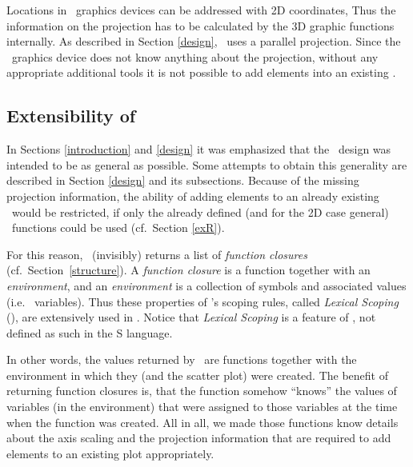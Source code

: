 Locations in \RR\ graphics devices can be addressed with 2D coordinates,
Thus the information on the projection has to be calculated by the 3D graphic functions internally.
As described in Section \ref{design}, \sdd\ uses a parallel projection.
Since the \RR\ graphics device does not know anything about the projection,
without any appropriate additional tools it is not possible to add elements into an existing \sdd .


\subsection{Extensibility of \sdd\label{exsdd}}
In Sections \ref{introduction} and \ref{design} it was emphasized
that the \sdd\ design was intended to be as general as possible.
Some attempts to obtain this generality are described in Section \ref{design} and its subsections.
Because of the missing projection information, the ability of adding
elements to an already existing \sdd\ would be restricted, if only the
already defined (and for the 2D case general) \RR\ functions could be used
(cf.\ Section \ref{exR}).

For this reason, \sdd\ (invisibly) returns a list of \textsl{function
  closures} (cf.\ Section~\ref{structure}).
A \textsl{function closure} is a function together with an
\textsl{environment},  and an \textsl{environment} is a collection of
symbols and associated values (i.e. \RR\ variables). Thus these properties
  of \RR's scoping rules, called \textsl{Lexical Scoping}
  (\cite{gentleman}), are extensively used in \sdd.
%
Notice that \textsl{Lexical Scoping} is a feature of \RR, not defined as
such in the \textsf{S} language.

In other words, the values returned by \sdd\ are functions together with
the environment in which they (and the scatter plot) were created.
The benefit of returning function closures is, that the function somehow
``knows'' the values of variables (in the environment) that were assigned
to those variables at the time when the function was created.  All in all,
we made those functions know details about the axis scaling and the
projection information that are required to add elements to an existing
plot appropriately.

